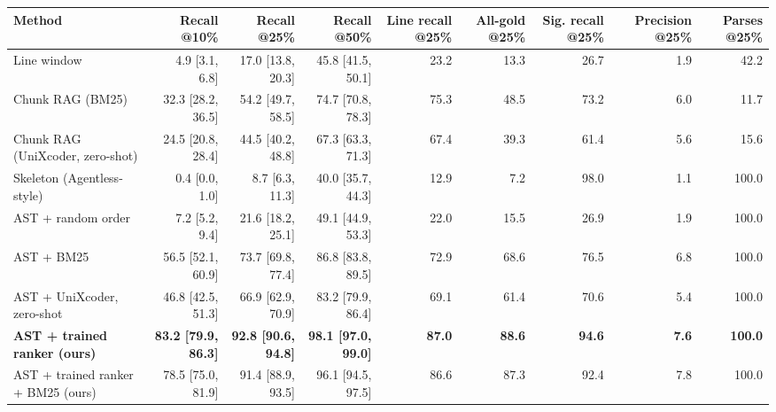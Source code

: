 \begin{tabular}{lrrrrrrrr}
\toprule
Method & Recall @10\% & Recall @25\% & Recall @50\% & Line recall @25\% & All-gold @25\% & Sig. recall @25\% & Precision @25\% & Parses @25\% \\
\midrule
Line window & 4.9 [3.1, 6.8] & 17.0 [13.8, 20.3] & 45.8 [41.5, 50.1] & 23.2 & 13.3 & 26.7 & 1.9 & 42.2 \\
Chunk RAG (BM25) & 32.3 [28.2, 36.5] & 54.2 [49.7, 58.5] & 74.7 [70.8, 78.3] & 75.3 & 48.5 & 73.2 & 6.0 & 11.7 \\
Chunk RAG (UniXcoder, zero-shot) & 24.5 [20.8, 28.4] & 44.5 [40.2, 48.8] & 67.3 [63.3, 71.3] & 67.4 & 39.3 & 61.4 & 5.6 & 15.6 \\
Skeleton (Agentless-style) & 0.4 [0.0, 1.0] & 8.7 [6.3, 11.3] & 40.0 [35.7, 44.3] & 12.9 & 7.2 & 98.0 & 1.1 & 100.0 \\
AST + random order & 7.2 [5.2, 9.4] & 21.6 [18.2, 25.1] & 49.1 [44.9, 53.3] & 22.0 & 15.5 & 26.9 & 1.9 & 100.0 \\
AST + BM25 & 56.5 [52.1, 60.9] & 73.7 [69.8, 77.4] & 86.8 [83.8, 89.5] & 72.9 & 68.6 & 76.5 & 6.8 & 100.0 \\
AST + UniXcoder, zero-shot & 46.8 [42.5, 51.3] & 66.9 [62.9, 70.9] & 83.2 [79.9, 86.4] & 69.1 & 61.4 & 70.6 & 5.4 & 100.0 \\
\textbf{AST + trained ranker (ours)} & \textbf{83.2 [79.9, 86.3]} & \textbf{92.8 [90.6, 94.8]} & \textbf{98.1 [97.0, 99.0]} & \textbf{87.0} & \textbf{88.6} & \textbf{94.6} & \textbf{7.6} & \textbf{100.0} \\
AST + trained ranker + BM25 (ours) & 78.5 [75.0, 81.9] & 91.4 [88.9, 93.5] & 96.1 [94.5, 97.5] & 86.6 & 87.3 & 92.4 & 7.8 & 100.0 \\
\bottomrule
\end{tabular}
